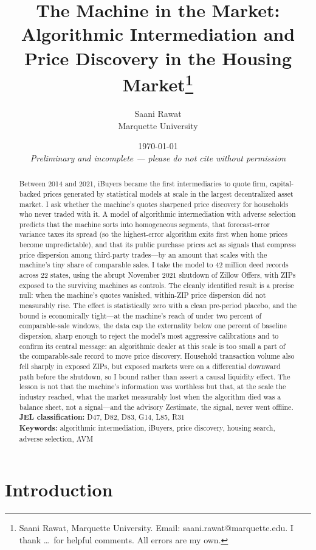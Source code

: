 \documentclass[12pt, letterpaper]{article}
\title{The Machine in the Market: Algorithmic Intermediation and Price Discovery in the Housing Market\thanks{Saani Rawat, Marquette University. Email: saani.rawat@marquette.edu. I thank \dots\ for helpful comments. All errors are my own.}}
\author{Saani Rawat\\Marquette University}
\date{\today\\\textit{Preliminary and incomplete --- please do not cite without permission}}
\theoremstyle{remark}
\begin{document}
\maketitle

\begin{abstract}
\noindent Between 2014 and 2021, iBuyers became the first intermediaries to quote firm, capital-backed prices generated by statistical models at scale in the largest decentralized asset market. I ask whether the machine's quotes sharpened price discovery for households who never traded with it. A model of algorithmic intermediation with adverse selection predicts that the machine sorts into homogeneous segments, that forecast-error variance taxes its spread (so the highest-error algorithm exits first when home prices become unpredictable), and that its public purchase prices act as signals that compress price dispersion among third-party trades---by an amount that scales with the machine's tiny share of comparable sales. I take the model to 42 million deed records across 22 states, using the abrupt November 2021 shutdown of Zillow Offers, with ZIPs exposed to the surviving machines as controls. The cleanly identified result is a precise null: when the machine's quotes vanished, within-ZIP price dispersion did not measurably rise. The effect is statistically zero with a clean pre-period placebo, and the bound is economically tight---at the machine's reach of under two percent of comparable-sale windows, the data cap the externality below one percent of baseline dispersion, sharp enough to reject the model's most aggressive calibrations and to confirm its central message: an algorithmic dealer at this scale is too small a part of the comparable-sale record to move price discovery. Household transaction volume also fell sharply in exposed ZIPs, but exposed markets were on a differential downward path before the shutdown, so I bound rather than assert a causal liquidity effect. The lesson is not that the machine's information was worthless but that, at the scale the industry reached, what the market measurably lost when the algorithm died was a balance sheet, not a signal---and the advisory Zestimate, the signal, never went offline. \\
\textbf{JEL classification:} D47, D82, D83, G14, L85, R31 \\
\textbf{Keywords:} algorithmic intermediation, iBuyers, price discovery, housing search, adverse selection, AVM
\end{abstract}

\section{Introduction}\label{sec:intro}
\end{document}
